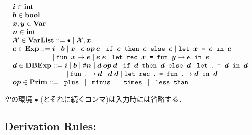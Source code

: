 \documentclass[11pt]{jarticle}
\begin{document}
\[\begin{array}{l}
\NamelessMLiiiMV{i}[] \in \mathbf{int}\\
\NamelessMLiiiMV{b}[] \in \mathbf{bool}\\
\NamelessMLiiiMV{x}[], \NamelessMLiiiMV{y}[] \in
\mathbf{Var}\\
\NamelessMLiiiMV{n}[] \in \mathbf{int}\\
\NamelessMLiiiMV{env}[] \in \mathbf{VarList} ::= \NamelessMLiiiEmptyTerm
\mid \NamelessMLiiiBindTerm{\NamelessMLiiiMV{env}[]}
{\NamelessMLiiiMV{x}[]}\\
\NamelessMLiiiMV{e}[] \in \mathbf{Exp} ::= \NamelessMLiiiMV{i}[]
\mid \NamelessMLiiiMV{b}[] \mid \NamelessMLiiiMV{x}[]
\mid \NamelessMLiiiBinOpTerm{\NamelessMLiiiMV{op}[]}{\NamelessMLiiiMV{e}[]}
{\NamelessMLiiiMV{e}[]} \mid \NamelessMLiiiIfTerm{\NamelessMLiiiMV{e}[]}
{\NamelessMLiiiMV{e}[]}{\NamelessMLiiiMV{e}[]}
\mid \NamelessMLiiiLetTerm{\NamelessMLiiiMV{x}[]}{\NamelessMLiiiMV{e}[]}
{\NamelessMLiiiMV{e}[]} \\ \hspace*{2.0cm}
\mid \NamelessMLiiiAbsTerm{\NamelessMLiiiMV{x}[]}
{\NamelessMLiiiMV{e}[]} \mid \NamelessMLiiiAppTerm{\NamelessMLiiiMV{e}[]}
{\NamelessMLiiiMV{e}[]} \mid \NamelessMLiiiLetRecTerm{\NamelessMLiiiMV{x}[]}
{\NamelessMLiiiMV{y}[]}{\NamelessMLiiiMV{e}[]}
{\NamelessMLiiiMV{e}[]}\\
\NamelessMLiiiMV{d}[] \in \mathbf{DBExp} ::= \NamelessMLiiiMV{i}[]
\mid \NamelessMLiiiMV{b}[]
\mid \NamelessMLiiiIndexTerm{\NamelessMLiiiMV{n}[]}
\mid \NamelessMLiiiBinOpDTerm{\NamelessMLiiiMV{op}[]}{\NamelessMLiiiMV{d}[]}
{\NamelessMLiiiMV{d}[]} \mid \NamelessMLiiiIfDTerm{\NamelessMLiiiMV{d}[]}
{\NamelessMLiiiMV{d}[]}{\NamelessMLiiiMV{d}[]}
\mid \NamelessMLiiiLetDTerm{\NamelessMLiiiMV{d}[]}{\NamelessMLiiiMV{d}[]}
 \\ \hspace*{2.7cm}
\mid \NamelessMLiiiAbsDTerm{\NamelessMLiiiMV{d}[]}
\mid \NamelessMLiiiAppDTerm{\NamelessMLiiiMV{d}[]}{\NamelessMLiiiMV{d}[]}
\mid \NamelessMLiiiLetRecDTerm{\NamelessMLiiiMV{d}[]}
{\NamelessMLiiiMV{d}[]}\\
\NamelessMLiiiMV{op}[] \in \mathbf{Prim} ::= \NamelessMLiiiPlusTerm
\mid \NamelessMLiiiMinusTerm \mid \NamelessMLiiiMultTerm
\mid \NamelessMLiiiLtTerm\\
\end{array}\]

空の環境 \(\bullet\) (とそれに続くコンマ)は入力時には省略する．

\subsection*{Derivation Rules:}
\NamelessMLiiiDisplayRules
\end{document}
